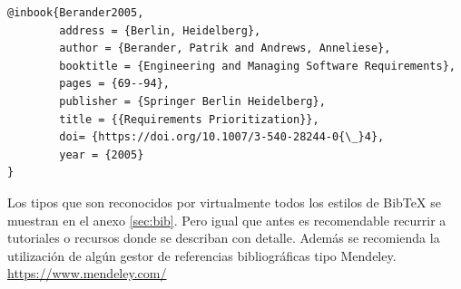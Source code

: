  \begin{verbatim}
@inbook{Berander2005,
        address = {Berlin, Heidelberg},
        author = {Berander, Patrik and Andrews, Anneliese},
        booktitle = {Engineering and Managing Software Requirements},
        pages = {69--94},
        publisher = {Springer Berlin Heidelberg},
        title = {{Requirements Prioritization}},
        doi= {https://doi.org/10.1007/3-540-28244-0{\_}4},
        year = {2005}
} 
 \end{verbatim}
 
 Los tipos que son reconocidos por virtualmente todos los estilos de BibTeX se muestran en el anexo \ref{sec:bib}. Pero igual que antes es recomendable recurrir a tutoriales o recursos donde se describan con detalle. Además se recomienda la utilización de algún gestor de referencias bibliográficas tipo Mendeley. \url{https://www.mendeley.com/}